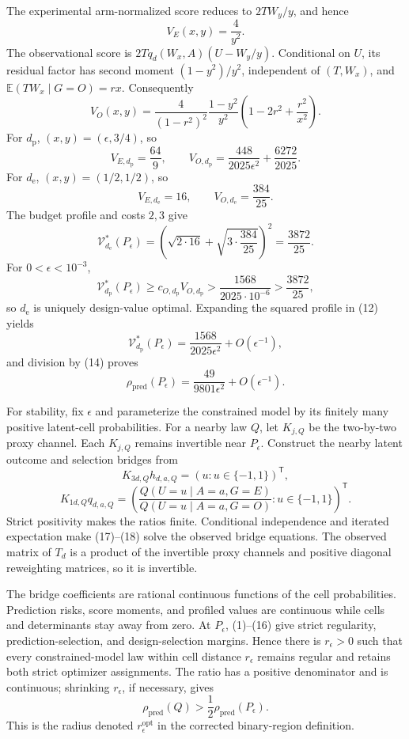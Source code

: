 The experimental arm-normalized score reduces to \(2TW_y/y\), and hence
\[
V_E(x,y)=\frac4{y^2}. \tag{10}
\]
The observational score is \(2Tq_d(W_x,A)(U-W_y/y)\). Conditional on \(U\), its residual factor has second moment \((1-y^2)/y^2\), independent of \((T,W_x)\), and \(\mathbb E(TW_x\mid G=O)=rx\). Consequently
\[
V_O(x,y)=\frac4{(1-r^2)^2}\frac{1-y^2}{y^2}
\left(1-2r^2+\frac{r^2}{x^2}\right). \tag{11}
\]
For \(d_{\mathrm p}\), \((x,y)=(\epsilon,3/4)\), so
\[
V_{E,d_{\mathrm p}}=\frac{64}{9},\qquad
V_{O,d_{\mathrm p}}
=\frac{448}{2025\epsilon^2}+\frac{6272}{2025}. \tag{12}
\]
For \(d_{\mathrm e}\), \((x,y)=(1/2,1/2)\), so
\[
V_{E,d_{\mathrm e}}=16,\qquad V_{O,d_{\mathrm e}}=\frac{384}{25}. \tag{13}
\]
The budget profile and costs \(2,3\) give
\[
\mathcal V_{d_{\mathrm e}}^*(P_\epsilon)
=\left(\sqrt{2\cdot16}+\sqrt{3\cdot\frac{384}{25}}\right)^2
=\frac{3872}{25}. \tag{14}
\]
For \(0<\epsilon<10^{-3}\),
\[
\mathcal V_{d_{\mathrm p}}^*(P_\epsilon)
\ge c_{O,d_{\mathrm p}}V_{O,d_{\mathrm p}}
>\frac{1568}{2025\cdot10^{-6}}
>\frac{3872}{25}, \tag{15}
\]
so \(d_{\mathrm e}\) is uniquely design-value optimal. Expanding the squared profile in (12) yields
\[
\mathcal V_{d_{\mathrm p}}^*(P_\epsilon)
=\frac{1568}{2025\epsilon^2}+O(\epsilon^{-1}),
\]
and division by (14) proves
\[
\rho_{\mathrm{pred}}(P_\epsilon)
=\frac{49}{9801\epsilon^2}+O(\epsilon^{-1}). \tag{16}
\]

For stability, fix \(\epsilon\) and parameterize the constrained model by its finitely many positive latent-cell probabilities. For a nearby law \(Q\), let \(K_{j,Q}\) be the two-by-two proxy channel. Each \(K_{j,Q}\) remains invertible near \(P_\epsilon\). Construct the nearby latent outcome and selection bridges from
\[
K_{3d,Q}h_{d,a,Q}=(u:u\in\{-1,1\})^{\mathsf T}, \tag{17}
\]
\[
K_{1d,Q}q_{d,a,Q}
=\left(\frac{Q(U=u\mid A=a,G=E)}
{Q(U=u\mid A=a,G=O)}:u\in\{-1,1\}\right)^{\mathsf T}. \tag{18}
\]
Strict positivity makes the ratios finite. Conditional independence and iterated expectation make (17)--(18) solve the observed bridge equations. The observed matrix of \(T_d\) is a product of the invertible proxy channels and positive diagonal reweighting matrices, so it is invertible.

The bridge coefficients are rational continuous functions of the cell probabilities. Prediction risks, score moments, and profiled values are continuous while cells and determinants stay away from zero. At \(P_\epsilon\), (1)--(16) give strict regularity, prediction-selection, and design-selection margins. Hence there is \(r_\epsilon>0\) such that every constrained-model law within cell distance \(r_\epsilon\) remains regular and retains both strict optimizer assignments. The ratio has a positive denominator and is continuous; shrinking \(r_\epsilon\), if necessary, gives
\[
\rho_{\mathrm{pred}}(Q)>\frac12\rho_{\mathrm{pred}}(P_\epsilon).
\]
This is the radius denoted \(r_\epsilon^{\mathrm{opt}}\) in the corrected binary-region definition.